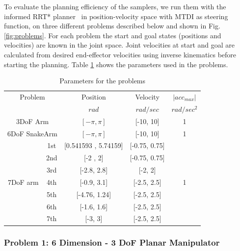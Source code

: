 \documentclass[letterpaper, 10 pt, conference]{ieeeconf}  %
\begin{document}
To evaluate the planning efficiency of the samplers, we run them with the informed RRT* planner~\cite{GSB14} in position-velocity space with MTDI as steering function, on three different problems described below and shown in Fig. \ref{fig:problems}. 
For each problem the start and goal states (positions and velocities) are known in the joint space. Joint velocities at start and goal are calculated from desired end-effector velocities using inverse kinematics before starting the planning. Table \ref{tab:params} shows the parameters used in the problems.


\begin {table}[H]
\caption {\captionstyle Parameters for the problems} \label{tab:params} 
\begin{center}
	\begin{tabular}{c c c c c} 
\toprule
\multicolumn{2}{c}{Problem} & Position  & Velocity & $|acc_{max}|$ \\ [0.5ex] 
    &    &    $rad$       &  $rad/sec$    &  $rad/sec^2$ \\
\midrule
\multicolumn{2}{c}{3DoF Arm} & $[-\pi, \pi]$ & [-10, 10] & 1 \\ 
\midrule
\multicolumn{2}{c}{6DoF SnakeArm} & $[-\pi, \pi]$ & [-10, 10] & 1 \\
\midrule
\multirow{7}{*}{7DoF arm} & 1st & [0.541593 , 5.74159] & [-0.75, 0.75] & \multirow{7}{*}{1} \\
\cmidrule{2-4}            & 2nd &  [-2 , 2]            & [-0.75, 0.75]  &  \\
\cmidrule{2-4}            & 3rd & [-2.8, 2.8]          & [-2, 2] &  \\
\cmidrule{2-4}            & 4th & [-0.9, 3.1]          & [-2.5, 2.5] &  \\
\cmidrule{2-4}            & 5th & [-4.76, 1.24]        & [-2.5, 2.5] &  \\
\cmidrule{2-4}            & 6th & [-1.6, 1.6]          & [-2.5, 2.5] &  \\
\cmidrule{2-4}            & 7th & [-3, 3]              & [-2.5, 2.5] &  \\
\bottomrule
\end{tabular}
\end{center}
\end{table}
\vspace{-2pt}

\subsubsection{Problem 1: 6 Dimension - 3 DoF Planar Manipulator}
\end{document}
